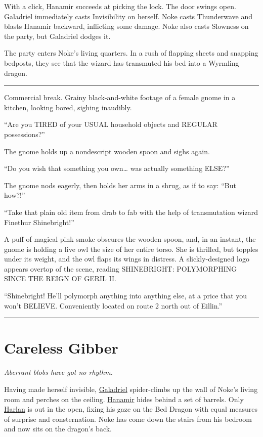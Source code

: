 \documentclass[smalldemyvopaper,11pt,twoside,onecolumn,openright,extrafontsizes]{memoir}
\newcommand{\chapdesc}[1]{
    \begin{flushright}
    \emph{{#1}}
    \end{flushright}
    \vspace{26pt}
}
\begin{document}
With a click, Hanamir succeeds at picking the lock. The door swings
open. Galadriel immediately casts Invisibility on herself. Noke casts
Thunderwave and blasts Hanamir backward, inflicting some damage. Noke
also casts Slowness on the party, but Galadriel dodges it.

The party enters Noke's living quarters. In a rush of flapping sheets
and snapping bedposts, they see that the wizard has transmuted his bed
into a Wyrmling dragon.

\begin{center}\rule{0.5\linewidth}{\linethickness}\end{center}

Commercial break. Grainy black-and-white footage of a female gnome in a
kitchen, looking bored, sighing inaudibly.

``Are you TIRED of your USUAL household objects and REGULAR
possessions?''

The gnome holds up a nondescript wooden spoon and sighs again.

``Do you wish that something you own\ldots{} was actually something
ELSE?''

The gnome nods eagerly, then holds her arms in a shrug, as if to say:
``But how?!''

``Take that plain old item from drab to fab with the help of
transmutation wizard Finethur Shinebright!''

A puff of magical pink smoke obscures the wooden spoon, and, in an
instant, the gnome is holding a live owl the size of her entire torso.
She is thrilled, but topples under its weight, and the owl flaps its
wings in distress. A slickly-designed logo appears overtop of the scene,
reading SHINEBRIGHT: POLYMORPHING SINCE THE REIGN OF GERIL II.

``Shinebright! He'll polymorph anything into anything else, at a price
that you won't BELIEVE. Conveniently located on route 2 north out of
Eillin.''

\begin{center}\rule{0.5\linewidth}{\linethickness}\end{center}


\chapter{Careless Gibber}
\chapdesc{Aberrant blobs have got no rhythm.}

Having made herself invisible, \href{/characters/galadriel/}{Galadriel}
spider-climbs up the wall of Noke's living room and perches on the
ceiling. \href{/characters/hanamir/}{Hanamir} hides behind a set of
barrels. Only \href{/characters/harlan/}{Harlan} is out in the open,
fixing his gaze on the Bed Dragon with equal measures of surprise and
consternation. Noke has come down the stairs from his bedroom and now
sits on the dragon's back.
\end{document}
